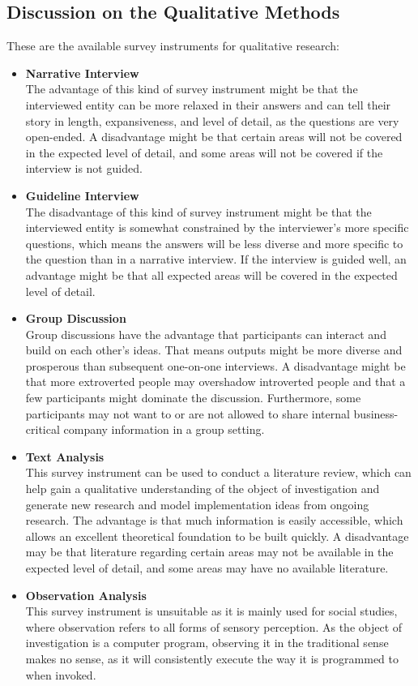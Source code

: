 \documentclass[draft,final]{thesisclass} %
\begin{document}
\subsection{Discussion on the Qualitative Methods}
These are the available survey instruments for qualitative research:
\begin{itemize}
    \item \textbf{Narrative Interview}\\
    The advantage of this kind of survey instrument might be that the interviewed entity can be more relaxed in their answers and can tell their story in length, expansiveness, and level of detail, as the questions are very open-ended.
    A disadvantage might be that certain areas will not be covered in the expected level of detail, and some areas will not be covered if the interview is not guided.
    \item \textbf{Guideline Interview}\\
    The disadvantage of this kind of survey instrument might be that the interviewed entity is somewhat constrained by the interviewer's more specific questions, which means the answers will be less diverse and more specific to the question than in a narrative interview.
    If the interview is guided well, an advantage might be that all expected areas will be covered in the expected level of detail.
    \item \textbf{Group Discussion}\\
    Group discussions have the advantage that participants can interact and build on each other's ideas.
    That means outputs might be more diverse and prosperous than subsequent one-on-one interviews.
    A disadvantage might be that more extroverted people may overshadow introverted people and that a few participants might dominate the discussion.
    Furthermore, some participants may not want to or are not allowed to share internal business-critical company information in a group setting.
    \item \textbf{Text Analysis}\\
    This survey instrument can be used to conduct a literature review, which can help gain a qualitative understanding of the object of investigation and generate new research and model implementation ideas from ongoing research.
    The advantage is that much information is easily accessible, which allows an excellent theoretical foundation to be built quickly.
    A disadvantage may be that literature regarding certain areas may not be available in the expected level of detail, and some areas may have no available literature.
    \item \textbf{Observation Analysis}\\
    This survey instrument is unsuitable as it is mainly used for social studies, where observation refers to all forms of sensory perception.
    As the object of investigation is a computer program, observing it in the traditional sense makes no sense, as it will consistently execute the way it is programmed to when invoked.
\end{itemize}
\end{document}
